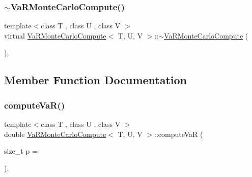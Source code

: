 \hypertarget{classVaRMonteCarloCompute_a372e6887ccaab471a23c49b3e7868fa5}{}\label{classVaRMonteCarloCompute_a372e6887ccaab471a23c49b3e7868fa5} 
\subsubsection{\texorpdfstring{$\sim$\+Va\+R\+Monte\+Carlo\+Compute()}{~VaRMonteCarloCompute()}}
{\footnotesize\ttfamily template$<$class T , class U , class V $>$ \\
virtual \hyperlink{classVaRMonteCarloCompute}{Va\+R\+Monte\+Carlo\+Compute}$<$ T, U, V $>$\+::$\sim$\hyperlink{classVaRMonteCarloCompute}{Va\+R\+Monte\+Carlo\+Compute} (\begin{DoxyParamCaption}{ }\end{DoxyParamCaption})\hspace{0.3cm}{\ttfamily [inline]}, {\ttfamily [virtual]}}



\subsection{Member Function Documentation}
\hypertarget{classVaRMonteCarloCompute_a43b5493187d834fa2ba1bdb53c353947}{}\label{classVaRMonteCarloCompute_a43b5493187d834fa2ba1bdb53c353947} 
\subsubsection{\texorpdfstring{compute\+Va\+R()}{computeVaR()}}
{\footnotesize\ttfamily template$<$class T , class U , class V $>$ \\
double \hyperlink{classVaRMonteCarloCompute}{Va\+R\+Monte\+Carlo\+Compute}$<$ T, U, V $>$\+::compute\+VaR (\begin{DoxyParamCaption}\item[{size\+\_\+t}]{p = {} }\end{DoxyParamCaption})\hspace{0.3cm}{\ttfamily [inline]}, {\ttfamily [virtual]}}



